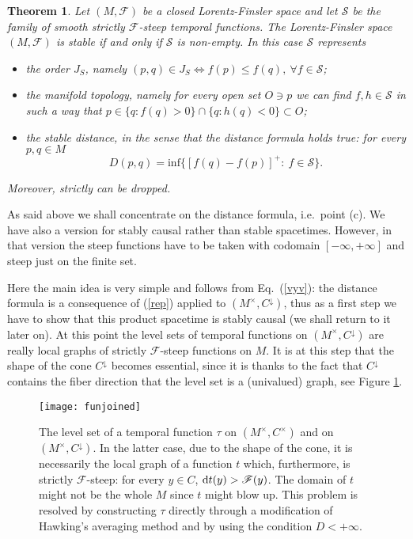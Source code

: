 \documentclass[a4paper]{jpconf}
\newtheorem{theorem}{Theorem}[section]
\theoremstyle{definition}
\theoremstyle{remark}
\newcommand{\dd}{{\rm d}}
\begin{document}
\begin{theorem} \label{aas}
Let $(M,\mathscr{F})$ be a closed Lorentz-Finsler space and let $\mathscr{S}$ be the family of smooth strictly  $\mathscr{F}$-steep temporal functions. The Lorentz-Finsler space  $(M,\mathscr{F})$ is stable if and only if $\mathscr{S}$  is non-empty. In this case $\mathscr{S}$   represents
\begin{itemize}
\item[(a)] the order $J_S$, namely $(p, q)\in J_S \Leftrightarrow f(p)\le f(q), \ \forall f \in \mathscr{S}$;
\item[(b)] the manifold topology, namely for every open set $O\ni p$ we can find $f,h \in \mathscr{S}$ in such a way that
$p\in \{q\colon f(q)>0\}\cap \{q\colon h(q)<0\}\subset O$;
\item[(c)] the stable distance, in the sense that  the distance formula holds true: for every $p,q\in M$
\begin{equation}
 D(p,q)=\mathrm{inf} \big\{[f(q)-f(p)]^+\colon \ f \in \mathscr{S}\big\}.
\end{equation}
\end{itemize}
Moreover, {\em strictly} can be dropped.
\end{theorem}
As said above we shall concentrate on the distance formula, i.e.\ point (c). We have also a version for stably causal rather than stable spacetimes. However, in that version the steep functions have to be taken with codomain $[-\infty,+\infty]$ and steep just on the finite set.

Here the main idea is very simple and follows from Eq.\ (\ref{vyv}): the distance formula is a consequence of (\ref{rep}) applied to $(M^\times, C^\downarrow)$, thus as a first step we have to show that this product spacetime is stably causal (we shall return to it later on). At this point the level sets of temporal functions on $(M^\times, C^\downarrow)$ are really local graphs of strictly $\mathscr{F}$-steep functions on $M$. It is at this step that the shape of the cone $C^\downarrow$ becomes essential, since it is thanks to the fact that $C^\downarrow$ contains the fiber direction that the level set is a (univalued) graph, see Figure \ref{mkz}.



 \begin{figure}[ht]
\begin{center}
 \texttt{[image: funjoined]}
\end{center}
\caption{The level set of a temporal function $\tau$ on $(M^\times, C^\times)$ and on $(M^\times, C^\downarrow)$. In the latter case, due to the shape of the cone, it is necessarily the local graph of a function $t$ which, furthermore, is strictly $\mathscr{F}$-steep: for every $y\in C$, $\dd t (y)>\mathscr{F}(y)$. The domain of $t$ might not be the whole $M$  since $t$ might blow up. This problem is resolved by constructing $\tau$ directly  through a modification of Hawking's averaging method and by using the condition $D<+\infty$.} \label{mkz}
\end{figure}
\end{document}
